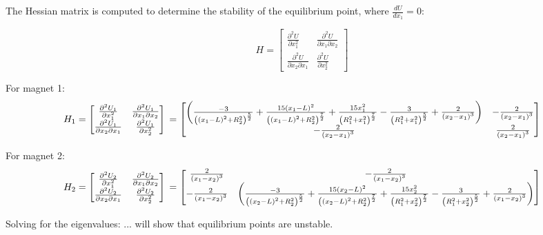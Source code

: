 \documentclass[english]{article}
\begin{document}
The Hessian matrix is computed to determine the stability of the equilibrium point, where $\frac{dU}{dx_1}=0$:

$$H = \begin{bmatrix}
	\frac{\partial ^2 U}{\partial x_1^2} & \frac{\partial ^2 U}{\partial x_1 \partial x_2}\\
	\frac{\partial ^2 U}{\partial x_2 \partial x_1} & \frac{\partial ^2 U}{\partial x_2^2}
\end{bmatrix}
$$

For magnet 1:
$$H_1 = \begin{bmatrix}
	\frac{\partial ^2 U_1}{\partial x_1^2} & \frac{\partial ^2 U_1}{\partial x_1 \partial x_2}\\
	\frac{\partial ^2 U_1}{\partial x_2 \partial x_1} & \frac{\partial ^2 U_1}{\partial x_2^2}
\end{bmatrix}
\\=
\begin{bmatrix}
	\left(\frac{-3}{\left(\left(x_1 - L\right)^2 + R_2^2\right)^{\frac{5}{2}}} + \frac{15\left(x_1-L\right)^2}{\left(\left(x_1 - L\right)^2 + R_2^2\right)^{\frac{7}{2}}} + \frac{15x_1^2}{\left(R_1^2 + x_1^2 \right)^{\frac{7}{2}}} - \frac{3}{\left(R_1^2 + x_1^2 \right)^{\frac{5}{2}}} + \frac{2}{\left(x_2-x_1\right)^3}\right)
	& 
	-\frac{2}{\left(x_2-x_1\right)^3}\\
	-\frac{2}{\left(x_2-x_1\right)^3}
	&
	\frac{2}{\left(x_2-x_1\right)^3}
\end{bmatrix}
$$

For magnet 2:
$$H_2 = \begin{bmatrix}
	\frac{\partial ^2 U_2}{\partial x_1^2} & \frac{\partial ^2 U_2}{\partial x_1 \partial x_2}\\
	\frac{\partial ^2 U_2}{\partial x_2 \partial x_1} & \frac{\partial ^2 U_2}{\partial x_2^2}
\end{bmatrix}
\\=
\begin{bmatrix}
	\frac{2}{\left(x_1-x_2\right)^3}	
	& 
	-\frac{2}{\left(x_1-x_2\right)^3}\\
	-\frac{2}{\left(x_1-x_2\right)^3}
	&
	\left(\frac{-3}{\left(\left(x_2 - L\right)^2 + R_2^2\right)^{\frac{5}{2}}} + \frac{15\left(x_2-L\right)^2}{\left(\left(x_2 - L\right)^2 + R_2^2\right)^{\frac{7}{2}}} + \frac{15x_2^2}{\left(R_1^2 + x_2^2 \right)^{\frac{7}{2}}} - \frac{3}{\left(R_1^2 + x_2^2 \right)^{\frac{5}{2}}} + \frac{2}{\left(x_1-x_2\right)^3}\right)
\end{bmatrix}
$$

Solving for the eigenvalues:
...
will show that equilibrium points are unstable.
\end{document}

